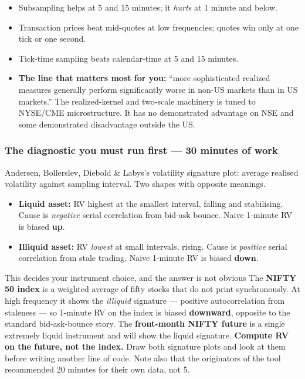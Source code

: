 \documentclass[11pt,a4paper]{article}
\begin{document}
\begin{itemize}
\item Subsampling helps at 5 and 15 minutes; it \emph{hurts} at 1 minute and below.
\item Transaction prices beat mid-quotes at low frequencies; quotes win only at
one tick or one second.
\item Tick-time sampling beats calendar-time at 5 and 15 minutes.
\item \textbf{The line that matters most for you:} ``more sophisticated realized
measures generally perform significantly worse in non-US markets than in US
markets.'' The realized-kernel and two-scale machinery is tuned to NYSE/CME
microstructure. It has no demonstrated advantage on NSE and some demonstrated
disadvantage outside the US.
\end{itemize}

\subsubsection{The diagnostic you must run first --- 30 minutes of work}

Andersen, Bollerslev, Diebold \& Labys's volatility signature plot: average
realised volatility against sampling interval. Two shapes with opposite meanings.

\begin{itemize}
\item \textbf{Liquid asset:} RV highest at the smallest interval, falling and
stabilising. Cause is \emph{negative} serial correlation from bid-ask bounce.
Naive 1-minute RV is biased \textbf{up}.
\item \textbf{Illiquid asset:} RV \emph{lowest} at small intervals, rising.
Cause is \emph{positive} serial correlation from stale trading. Naive 1-minute RV
is biased \textbf{down}.
\end{itemize}

\begin{keyfact}{This decides your instrument choice, and the answer is not obvious}
The \textbf{NIFTY 50 index} is a weighted average of fifty stocks that do not
print synchronously. At high frequency it shows the \emph{illiquid} signature ---
positive autocorrelation from staleness --- so 1-minute RV on the index is biased
\textbf{downward}, opposite to the standard bid-ask-bounce story. The
\textbf{front-month NIFTY future} is a single extremely liquid instrument and will
show the liquid signature. \textbf{Compute RV on the future, not the index.} Draw
both signature plots and look at them before writing another line of code. Note
also that the originators of the tool recommended 20 minutes for their own data,
not 5.
\end{keyfact}
\end{document}
